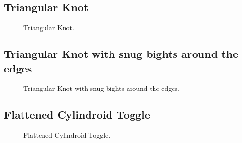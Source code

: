 \subsection{Triangular Knot}

\begin{figure}[H]\centering
	\begin{minipage}{1\linewidth}
		\begin{center}
			\tcbox[enhanced jigsaw,colframe=black,opacityframe=0.5,opacityback=0.5]
			{\centering{}}
		\end{center}
	\end{minipage}
\caption{Triangular Knot.}
\label{ris:Triangular_Knot}
\end{figure}

\subsection{Triangular Knot with snug bights around the edges}

\begin{figure}[H]\centering
	\begin{minipage}{1\linewidth}
		\begin{center}
			\tcbox[enhanced jigsaw,colframe=black,opacityframe=0.5,opacityback=0.5]
			{\centering{}}
		\end{center}
	\end{minipage}
\caption{Triangular Knot with snug bights around the edges.}
\label{ris:Triangular_Knot_with_snug}
\end{figure}

\subsection{Flattened Cylindroid Toggle}

\begin{figure}[H]\centering
	\begin{minipage}{1\linewidth}
		\begin{center}
			\tcbox[enhanced jigsaw,colframe=black,opacityframe=0.5,opacityback=0.5]
			{\centering{}}
		\end{center}
	\end{minipage}
\caption{Flattened Cylindroid Toggle.}
\label{ris:Flattened_Cylindroid_Toggle}
\end{figure}

